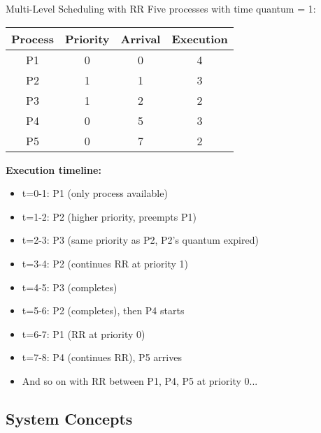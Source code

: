 \begin{example2}{Multi-Level Scheduling with RR}
    Five processes with time quantum = 1:
    
    \begin{tabular}{|c|c|c|c|}
        \hline
        Process & Priority & Arrival & Execution \\
        \hline
        P1 & 0 & 0 & 4 \\
        P2 & 1 & 1 & 3 \\
        P3 & 1 & 2 & 2 \\
        P4 & 0 & 5 & 3 \\
        P5 & 0 & 7 & 2 \\
        \hline
    \end{tabular}
    
    \tcblower
    
    \textbf{Execution timeline:}
    \begin{itemize}
        \item t=0-1: P1 (only process available)
        \item t=1-2: P2 (higher priority, preempts P1)
        \item t=2-3: P3 (same priority as P2, P2's quantum expired)
        \item t=3-4: P2 (continues RR at priority 1)
        \item t=4-5: P3 (completes)
        \item t=5-6: P2 (completes), then P4 starts
        \item t=6-7: P1 (RR at priority 0)
        \item t=7-8: P4 (continues RR), P5 arrives
        \item And so on with RR between P1, P4, P5 at priority 0...
    \end{itemize}
\end{example2}

\subsection{System Concepts}

